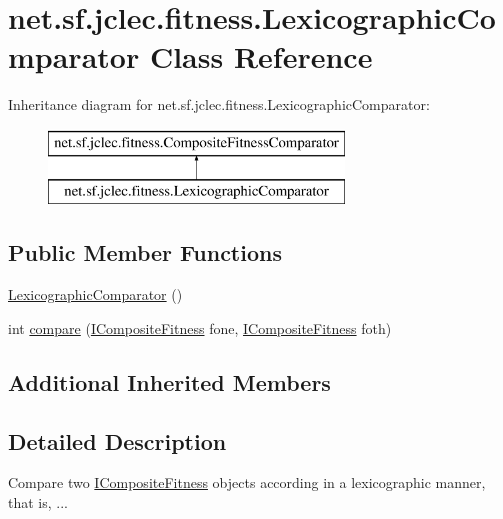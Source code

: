 \hypertarget{classnet_1_1sf_1_1jclec_1_1fitness_1_1_lexicographic_comparator}{\section{net.\-sf.\-jclec.\-fitness.\-Lexicographic\-Comparator Class Reference}
\label{classnet_1_1sf_1_1jclec_1_1fitness_1_1_lexicographic_comparator}
}
Inheritance diagram for net.\-sf.\-jclec.\-fitness.\-Lexicographic\-Comparator\-:\begin{figure}[H]
\begin{center}
\leavevmode
\includegraphics[height=2.000000cm]{classnet_1_1sf_1_1jclec_1_1fitness_1_1_lexicographic_comparator}
\end{center}
\end{figure}
\subsection*{Public Member Functions}
\begin{DoxyCompactItemize}
\item 
\hyperlink{classnet_1_1sf_1_1jclec_1_1fitness_1_1_lexicographic_comparator_ac2fb15ff76cafb04e7c3f38d659ef2f9}{Lexicographic\-Comparator} ()
\item 
int \hyperlink{classnet_1_1sf_1_1jclec_1_1fitness_1_1_lexicographic_comparator_ae157ca7826ebee623cce24f6eebdf99b}{compare} (\hyperlink{interfacenet_1_1sf_1_1jclec_1_1fitness_1_1_i_composite_fitness}{I\-Composite\-Fitness} fone, \hyperlink{interfacenet_1_1sf_1_1jclec_1_1fitness_1_1_i_composite_fitness}{I\-Composite\-Fitness} foth)
\end{DoxyCompactItemize}
\subsection*{Additional Inherited Members}


\subsection{Detailed Description}
Compare two \hyperlink{interfacenet_1_1sf_1_1jclec_1_1fitness_1_1_i_composite_fitness}{I\-Composite\-Fitness} objects according in a lexicographic manner, that is, ...

